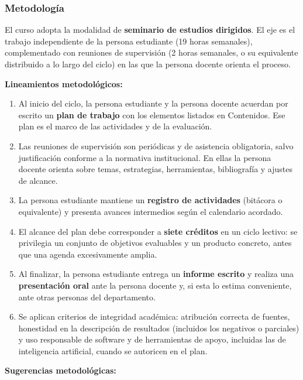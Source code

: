 \begin{refsection}
\subsubsection*{Metodología}

El curso adopta la modalidad de \textbf{seminario de estudios dirigidos}. El eje es el trabajo independiente de la persona estudiante (19 horas semanales), complementado con reuniones de supervisión (2 horas semanales, o su equivalente distribuido a lo largo del ciclo) en las que la persona docente orienta el proceso.

\noindent \textbf{Lineamientos metodológicos:}

\begin{enumerate}
    \item Al inicio del ciclo, la persona estudiante y la persona docente acuerdan por escrito un \textbf{plan de trabajo} con los elementos listados en Contenidos. Ese plan es el marco de las actividades y de la evaluación.
    \item Las reuniones de supervisión son periódicas y de asistencia obligatoria, salvo justificación conforme a la normativa institucional. En ellas la persona docente orienta sobre temas, estrategias, herramientas, bibliografía y ajustes de alcance.
    \item La persona estudiante mantiene un \textbf{registro de actividades} (bitácora o equivalente) y presenta avances intermedios según el calendario acordado.
    \item El alcance del plan debe corresponder a \textbf{siete créditos} en un ciclo lectivo: se privilegia un conjunto de objetivos evaluables y un producto concreto, antes que una agenda excesivamente amplia.
    \item Al finalizar, la persona estudiante entrega un \textbf{informe escrito} y realiza una \textbf{presentación oral} ante la persona docente y, si esta lo estima conveniente, ante otras personas del departamento.
    \item Se aplican criterios de integridad académica: atribución correcta de fuentes, honestidad en la descripción de resultados (incluidos los negativos o parciales) y uso responsable de software y de herramientas de apoyo, incluidas las de inteligencia artificial, cuando se autoricen en el plan.
\end{enumerate}

\textbf{Sugerencias metodológicas:}


\end{refsection}
